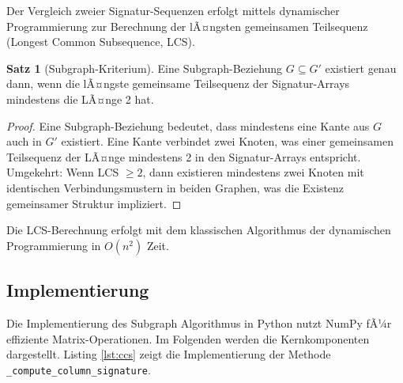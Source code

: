 ﻿\documentclass[a4paper,12pt]{article}
\theoremstyle{definition}
\newtheorem{satz}{Satz}
\begin{document}
Der Vergleich zweier Signatur-Sequenzen erfolgt mittels dynamischer Programmierung zur Berechnung der lÃ¤ngsten gemeinsamen Teilsequenz (Longest Common Subsequence, LCS).

\begin{satz}[Subgraph-Kriterium]
	Eine Subgraph-Beziehung $G \subseteq G'$ existiert genau dann, wenn die lÃ¤ngste gemeinsame Teilsequenz der Signatur-Arrays mindestens die LÃ¤nge 2 hat.
\end{satz}

\begin{proof}
	Eine Subgraph-Beziehung bedeutet, dass mindestens eine Kante aus $G$ auch in $G'$ existiert. Eine Kante verbindet zwei Knoten, was einer gemeinsamen Teilsequenz der LÃ¤nge mindestens 2 in den Signatur-Arrays entspricht. Umgekehrt: Wenn LCS $\geq 2$, dann existieren mindestens zwei Knoten mit identischen Verbindungsmustern in beiden Graphen, was die Existenz gemeinsamer Struktur impliziert.
\end{proof}

Die LCS-Berechnung erfolgt mit dem klassischen Algorithmus der dynamischen Programmierung in $O(n^2)$ Zeit.

\subsection{Implementierung}

Die Implementierung des Subgraph Algorithmus in Python nutzt NumPy fÃ¼r effiziente Matrix-Operationen. Im Folgenden werden die Kernkomponenten dargestellt. Listing \ref{lst:ccs} zeigt die Implementierung der Methode \texttt{\_compute\_column\_signature}.
\end{document}
